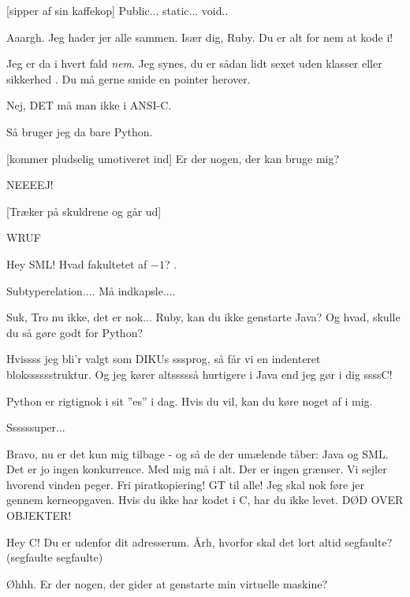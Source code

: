 \documentclass[a4paper,11pt]{article}
\begin{document}
\begin{sketch}
 [sipper af sin kaffekop] Public... static... void.. 


 Aaargh. Jeg hader jer alle sammen. Is\ae{}r dig, Ruby. Du er alt for nem at kode i!

 Jeg er da i hvert fald \emph{nem}. Jeg synes, du er s\aa{}dan lidt sexet
uden klasser eller sikkerhed . Du m\aa{} gerne smide en pointer
herover.

 Nej, DET m\aa{} man ikke i ANSI-C.

 S\aa{} bruger jeg da bare Python.

[kommer pludselig umotiveret ind] Er der nogen, der kan bruge mig?

  NEEEEJ!

 [Tr\ae{}ker p\aa{} skuldrene og g\aa{}r ud]

 WRUF 

  Hey SML!  Hvad fakultetet af $-1$? .


 Subtyperelation.... M\aa{} indkapsle....

 Suk, Tro nu ikke, det er nok... Ruby, kan du ikke genstarte Java?  Og hvad, skulle du s\aa{} g\o{}re godt for Python?

 Hvissss jeg bli'r valgt som DIKUs sssprog, s\aa{} f\aa{}r vi en
indenteret bloksssssstruktur. Og jeg k\o{}rer altsssss\aa{} hurtigere i Java
end jeg g\o{}r i dig ssssC!

 Python er rigtignok i sit ''es'' i dag. Hvis du vil, kan du k\o{}re
noget af i mig.

 Ssssssuper... 

 Bravo, nu er det kun mig tilbage -  og s\aa{} de der um\ae{}lende t\aa{}ber: Java og SML. Det er jo ingen konkurrence. Med mig m\aa{} i alt.  
Der er ingen gr\ae{}nser. Vi sejler hvorend vinden peger. Fri piratkopiering! GT til alle!  Jeg skal nok f\o{}re jer gennem kerneopgaven. Hvis du ikke har kodet i C, har du ikke levet. DØD OVER OBJEKTER!

 Hey C! Du er udenfor dit adresserum. \AA rh, hvorfor skal det lort altid segfaulte? (segfaulte segfaulte)


 \O hhh. Er der nogen, der gider at genstarte min virtuelle maskine?


\end{sketch}
\end{document}
